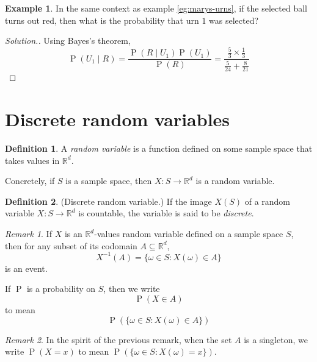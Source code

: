 \documentclass[11pt]{article}
\makeatletter
\theoremstyle{definition}
\newtheorem{defn}{Definition}[section]
\newtheorem{eg}{Example}
\theoremstyle{remark}
\newtheorem{rem}{Remark}[section]
\newenvironment{solution}{
    \let\oldqedsymbol=\qedsymbol%
    \def\@addpunct##1{}%
    \renewcommand{\qedsymbol}{$\blacktriangleleft$}%
    \begin{proof}[\textit Solution.]
}{
    \end{proof}%
    \renewcommand{\qedsymbol}{\oldqedsymbol}
}
\newcommand{\parens}[1]{\left(#1\right)}
\newcommand{\given}{\;\vert\;}
\newcommand{\inv}{^{-1}}
\newcommand{\R}{\mathbb{R}}
\DeclareMathOperator{\Prob}{P}
\renewcommand{\P}[1]{\Prob{\parens{#1}}}
\makeatother
\begin{document}
\begin{eg}
    In the same context as example \ref{eg:marys-urns}, if the selected ball
    turns out red, then what is the probability that urn $1$ was selected?
\end{eg}

\begin{solution}
    Using Bayes's theorem,
    \begin{equation*}
        \P{U_1 \given R}
        = \frac{\P{R \given U_1} \P{U_1}}{\P{R}}
        = \frac{\frac{5}{3} \times \frac{1}{3}}{\frac{5}{24} + \frac{8}{21}}
    \end{equation*}
\end{solution}

\section{Discrete random variables}

\begin{defn}
    A \emph{random variable} is a function defined on some sample space that
    takes values in $\R^d$.

    Concretely, if $S$ is a sample space, then $X : S \to \R^d$ is a random
    variable.
\end{defn}

\begin{defn}{(Discrete random variable.)}
    If the image $X(S)$ of a random variable $X : S \to \R^d$ is countable, the
    variable is said to be \emph{discrete}.
\end{defn}

\begin{rem}
    If $X$ is an $\R^d$-values random variable defined on a sample space $S$,
    then for any subset of its codomain $A \subseteq \R^d$,
    \begin{equation}
        \label{eq:random-variable-preimage}
        X\inv (A) = \{\omega \in S : X(\omega) \in A\}
    \end{equation}
    is an event.

    If $\Prob$ is a probability on $S$, then we write
    \begin{equation*}
        \P{X \in A}
    \end{equation*}
    to mean
    \begin{equation*}
        \P{\{\omega \in S : X(\omega) \in A\}}
    \end{equation*}
\end{rem}

\begin{rem}
    In the spirit of the previous remark, when the set $A$ is a singleton, we
    write $\P{X = x}$ to mean $\P{\{\omega \in S : X(\omega) = x\}}$.
\end{rem}
\end{document}
